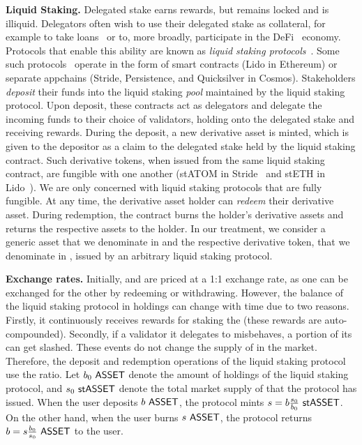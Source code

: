 \noindent
\textbf{Liquid Staking.} Delegated stake earns rewards, but remains locked and
is illiquid. Delegators often wish to use their delegated stake as collateral,
for example to take loans~\cite{gudgeon2020defi} or to, more broadly, participate in the
DeFi~\cite{defi-sok} economy. Protocols that enable this ability are known as
\emph{liquid staking protocols}~\cite{liquid-staking-report}.
Some such protocols~\cite{lido,stride} operate
in the form of smart contracts (\eg Lido in Ethereum) or separate appchains
(\eg Stride, Persistence, and Quicksilver in Cosmos).
Stakeholders \emph{deposit} their funds into the liquid staking \emph{pool} maintained
by the liquid staking protocol. Upon deposit, these contracts act as
delegators and delegate the incoming funds to their choice of validators, holding
onto the delegated stake and receiving rewards.
During the deposit, a new derivative asset is minted,
which is given to the depositor as a claim to the delegated stake held by the
liquid staking contract. Such derivative tokens, when issued from the same liquid
staking contract, are fungible with one another (\eg \textsf{stATOM} in Stride~\cite{stride}
and \textsf{stETH} in Lido~\cite{lido}). We are only concerned with liquid
staking protocols that are fully fungible. At any time, the derivative asset holder
can \emph{redeem} their derivative asset.
During redemption, the contract burns
the holder's derivative assets and returns the respective assets to the holder.
In our treatment, we consider a generic asset that we denominate in \asset
and the respective derivative token, that we denominate in \stasset,
issued by an arbitrary liquid staking protocol.

\noindent
\textbf{Exchange rates.} Initially, \asset and \stasset are priced at a 1:1 exchange rate,
as one can be exchanged for the other by redeeming or withdrawing. However, the balance
of the liquid staking protocol in \asset holdings can change with time due to two reasons.
Firstly, it continuously receives rewards for staking the \asset (these rewards are
auto-compounded). Secondly, if a validator it delegates to misbehaves, a portion of its
\asset can get slashed. These events do not change the supply of \stasset in the market.
Therefore, the deposit and redemption operations of the liquid staking protocol use
the ratio. Let $b_0 ~\text{\textsf{ASSET}}$ denote the amount of \asset holdings of the liquid staking
protocol, and $s_0 ~\text{\textsf{stASSET}}$ denote the total market supply of \stasset that the protocol
has issued. When the user deposits $b ~\text{\textsf{ASSET}}$, the protocol mints $s = b \frac{s_0}{b_0} ~\text{\textsf{stASSET}}$.
On the other hand, when the user burns $s ~\text{\textsf{ASSET}}$, the protocol returns $b = s \frac{b_0}{s_0} ~\text{\textsf{ASSET}}$
to the user.

